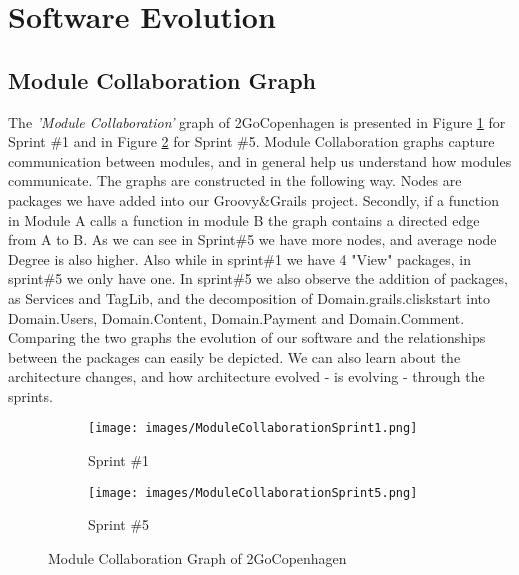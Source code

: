 \section{Software Evolution}

\subsection{Module Collaboration Graph}

The \emph{'Module Collaboration'} graph of 2GoCopenhagen is presented in Figure \ref{CollabGraph1} for Sprint \#1 and in Figure \ref{CollabGraph5} for Sprint \#5.
Module Collaboration graphs capture communication between modules, and in general help us understand how modules communicate. The graphs are constructed in the following way. Nodes are packages we have added into our Groovy\&Grails project. Secondly, if a function in Module A calls a function in module B the graph contains a directed edge from A to B. As we can see in Sprint\#5 we have more nodes, and average node Degree is also higher. Also while in sprint\#1 we have 4 "View" packages, in sprint\#5 we only have one. In sprint\#5 we also observe the addition of packages, as Services and TagLib, and the decomposition of Domain.grails.cliskstart into  Domain.Users, Domain.Content, Domain.Payment and Domain.Comment. Comparing the two graphs the evolution of our software and the relationships between the packages can easily be depicted. We can also learn about the architecture changes, and how architecture evolved - is evolving - through the sprints.  

\begin{figure}[H]
        \centering
        \begin{subfigure}[H]{0.5\textwidth}
                \texttt{[image: images/ModuleCollaborationSprint1.png]}
                \caption{Sprint \#1}
                \label{CollabGraph1}
        \end{subfigure}%
        \begin{subfigure}[H]{0.5\textwidth}
                \texttt{[image: images/ModuleCollaborationSprint5.png]}
                \caption{Sprint \#5}
                \label{CollabGraph5}
        \end{subfigure}
        \caption{Module Collaboration Graph of 2GoCopenhagen}\label{CollabGraph}
\end{figure}

